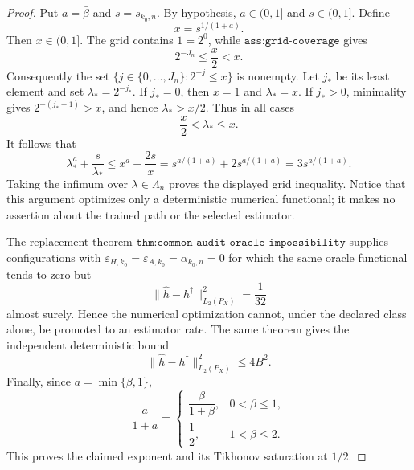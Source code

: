 \begin{proof}
Put \(a=\bar\beta\) and \(s=s_{k_0,n}\). By hypothesis, \(a\in(0,1]\) and \(s\in(0,1]\). Define
\[
 x=s^{1/(1+a)}.
\]
Then \(x\in(0,1]\). The grid contains \(1=2^0\), while \(\texttt{ass:grid-coverage}\) gives
\[
 2^{-J_n}\le \frac{x}{2}<x.
\]
Consequently the set \(\{j\in\{0,\ldots,J_n\}:2^{-j}\le x\}\) is nonempty. Let \(j_*\) be its least element and set \(\lambda_*=2^{-j_*}\). If \(j_*=0\), then \(x=1\) and \(\lambda_*=x\). If \(j_*>0\), minimality gives \(2^{-(j_*-1)}>x\), and hence \(\lambda_*>x/2\). Thus in all cases
\[
 \frac{x}{2}<\lambda_*\le x.
\]
It follows that
\[
 \lambda_*^a+\frac{s}{\lambda_*}
 \le x^a+\frac{2s}{x}
 =s^{a/(1+a)}+2s^{a/(1+a)}
 =3s^{a/(1+a)}.
\]
Taking the infimum over \(\lambda\in\Lambda_n\) proves the displayed grid inequality. Notice that this argument optimizes only a deterministic numerical functional; it makes no assertion about the trained path or the selected estimator.

The replacement theorem \(\texttt{thm:common-audit-oracle-impossibility}\) supplies configurations with \(\varepsilon_{H,k_0}=\varepsilon_{A,k_0}=\alpha_{k_0,n}=0\) for which the same oracle functional tends to zero but
\[
 \|\widehat h-h^\dagger\|_{L_2(P_X)}^2=\frac1{32}
\]
almost surely. Hence the numerical optimization cannot, under the declared class alone, be promoted to an estimator rate. The same theorem gives the independent deterministic bound
\[
 \|\widehat h-h^\dagger\|_{L_2(P_X)}^2\le4B^2.
\]
Finally, since \(a=\min\{\beta,1\}\),
\[
 \frac{a}{1+a}
 =\begin{cases}
 \dfrac{\beta}{1+\beta},&0<\beta\le1,\\[4pt]
 \dfrac12,&1<\beta\le2.
 \end{cases}
\]
This proves the claimed exponent and its Tikhonov saturation at \(1/2\).
\end{proof}